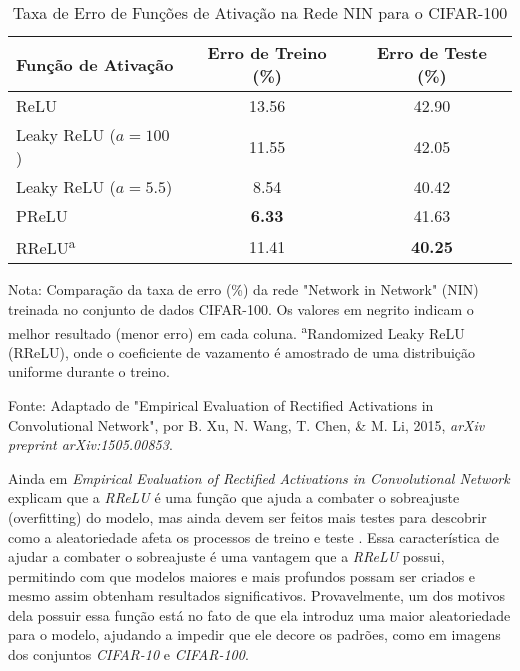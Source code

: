 \begin{table}[ht]
    \centering
    \begin{threeparttable}
        \caption{Taxa de Erro de Funções de Ativação na Rede NIN para o CIFAR-100}
        \label{tab:rrelu-cifar-100}
        \begin{tabular}{lcc}
            \toprule
            \textbf{Função de Ativação} & \textbf{Erro de Treino (\%)} & \textbf{Erro de Teste (\%)} \\
            \midrule
            
            ReLU                      & 13.56 & 42.90 \\
            \addlinespace
            Leaky ReLU ($a=100$)      & 11.55 & 42.05 \\
            Leaky ReLU ($a=5.5$)      & 8.54  & 40.42 \\
            \addlinespace
            PReLU                     & \textbf{6.33}  & 41.63 \\
            \addlinespace
            RReLU\textsuperscript{a}  & 11.41 & \textbf{40.25} \\
            
            \bottomrule
        \end{tabular}
        
        \begin{tablenotes}[para]
            \small
            \item[] Nota: Comparação da taxa de erro (\%) da rede "Network in Network" (NIN) treinada no conjunto de dados CIFAR-100. Os valores em negrito indicam o melhor resultado (menor erro) em cada coluna. \textsuperscript{a}Randomized Leaky ReLU (RReLU), onde o coeficiente de vazamento é amostrado de uma distribuição uniforme durante o treino.
            \item[] Fonte: Adaptado de "Empirical Evaluation of Rectified Activations in Convolutional Network", por B. Xu, N. Wang, T. Chen, \& M. Li, 2015, \textit{arXiv preprint arXiv:1505.00853}.
        \end{tablenotes}
        
    \end{threeparttable}
\end{table}

Ainda em \textit{Empirical Evaluation of Rectified Activations in Convolutional Network} \textcite{XuRReLU} explicam que a \textit{RReLU} é uma função que ajuda a combater o sobreajuste (overfitting) do modelo, mas ainda devem ser feitos mais testes para descobrir como a aleatoriedade afeta os processos de treino e teste \parencite{XuRReLU}. Essa característica de ajudar a combater o sobreajuste é uma vantagem que a \textit{RReLU} possui, permitindo com que modelos maiores e mais profundos possam ser criados e mesmo assim obtenham resultados significativos. Provavelmente, um dos motivos dela possuir essa função está no fato de que ela introduz uma maior aleatoriedade para o modelo, ajudando a impedir que ele decore os padrões, como em imagens dos conjuntos \textit{CIFAR-10} e \textit{CIFAR-100}.

